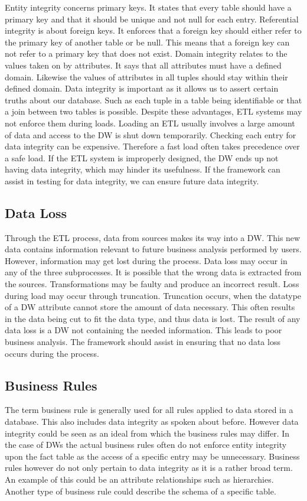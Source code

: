 Entity integrity concerns primary keys. It states that every table should have a primary key and that it should be unique and not null for each entry. Referential integrity is about foreign keys. It enforces that a foreign key should either refer to the primary key of another table or be null. This means that a foreign key can not refer to a primary key that does not exist.  Domain integrity relates to the values taken on by attributes. It says that all attributes must have a defined domain. Likewise the values of attributes in all tuples should stay within their defined domain. Data integrity is important as it allows us to assert certain truths about our database. Such as each tuple in a table being identifiable or that a join between two tables is possible. Despite these advantages, ETL systems may not enforce them during loads. Loading an ETL usually involves a large amount of data and access to the DW is shut down temporarily. Checking each entry for data integrity can be expensive. Therefore a fast load often takes precedence over a safe load. If the ETL system is improperly designed, the DW ends up not having data integrity, which may hinder its usefulness. If the framework can assist in testing for data integrity, we can ensure future data integrity.

\subsection{Data Loss}
Through the ETL process, data from sources makes its way into a DW. This new data contains information relevant to future business analysis performed by users. However, information may get lost during the process. Data loss may occur in any of the three subprocesses. It is possible that the wrong data is extracted from the sources. Transformations may be faulty and produce an incorrect result. Loss during load may occur  through truncation. Truncation occurs, when the datatype of a DW attribute cannot store the amount of data necessary. This often results in the data being cut to fit the data type, and thus data is lost.  The result of any data loss is a DW not containing the needed information. This leads to poor business analysis. The framework should assist in ensuring that no data loss occurs during the process.

\subsection{Business Rules}
The term business rule is generally used for all rules applied to data stored in a database. This also includes data integrity as spoken about before. However data integrity could be seen as an ideal from which the business rules may differ. In the case of DWs the actual business rules often do not enforce entity integrity upon the fact table as the access of a specific entry may be unnecessary. Business rules however do not only pertain to data integrity as it is a rather broad term. An example of this could be an attribute relationships such as hierarchies. Another type of business rule could describe the schema of a specific table.

